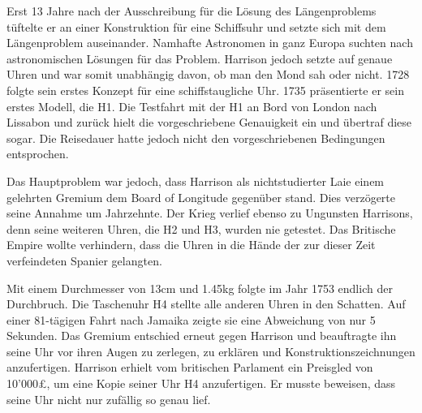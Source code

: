 \begin{refsection}
Erst 13 Jahre nach der Ausschreibung für die Lösung des Längenproblems tüftelte er an einer Konstruktion für eine Schiffsuhr und setzte sich mit dem Längenproblem auseinander.
Namhafte Astronomen in ganz Europa suchten nach astronomischen Lösungen für das Problem. Harrison jedoch setzte auf genaue Uhren und war somit unabhängig davon, ob man den Mond sah oder nicht.
1728 folgte sein erstes Konzept für eine schiffstaugliche Uhr. 1735 präsentierte er sein erstes Modell, die H1. Die Testfahrt mit der H1 an Bord von London nach Lissabon und zurück hielt die vorgeschriebene Genauigkeit ein und übertraf diese sogar. Die Reisedauer hatte jedoch nicht den vorgeschriebenen Bedingungen entsprochen.

Das Hauptproblem war jedoch, dass Harrison als nichtstudierter Laie einem gelehrten Gremium dem Board of Longitude gegenüber stand. Dies verzögerte seine Annahme um Jahrzehnte. Der Krieg verlief ebenso zu Ungunsten Harrisons, denn seine weiteren Uhren, die H2 und H3, wurden nie getestet. Das Britische Empire wollte verhindern, dass die Uhren in die Hände der zur dieser Zeit verfeindeten Spanier gelangten.

Mit einem Durchmesser von 13cm und 1.45kg folgte im Jahr 1753 endlich der Durchbruch.
Die Taschenuhr H4 stellte alle anderen Uhren in den Schatten. Auf einer 81-tägigen Fahrt nach Jamaika zeigte sie eine Abweichung von nur 5 Sekunden.
Das Gremium entschied erneut gegen Harrison und beauftragte ihn seine Uhr vor ihren Augen zu zerlegen, zu erklären und Konstruktionszeichnungen anzufertigen.
Harrison erhielt vom britischen Parlament ein Preisgled von 10’000£, um eine Kopie seiner Uhr H4 anzufertigen. Er musste beweisen, dass seine Uhr nicht nur zufällig so genau lief.


\end{refsection}
